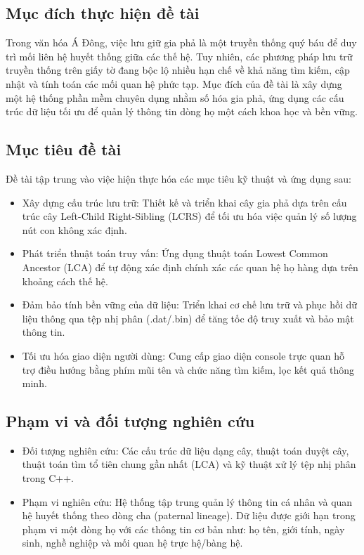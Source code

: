 \subsection{Mục đích thực hiện đề tài}

Trong văn hóa Á Đông, việc lưu giữ gia phả là một truyền thống quý báu để duy trì mối liên hệ huyết thống giữa các thế hệ. Tuy nhiên, các phương pháp lưu trữ truyền thống trên giấy tờ đang bộc lộ nhiều hạn chế về khả năng tìm kiếm, cập nhật và tính toán các mối quan hệ phức tạp. Mục đích của đề tài là xây dựng một hệ thống phần mềm chuyên dụng nhằm số hóa gia phả, ứng dụng các cấu trúc dữ liệu tối ưu để quản lý thông tin dòng họ một cách khoa học và bền vững.

\subsection{Mục tiêu đề tài}
Đề tài tập trung vào việc hiện thực hóa các mục tiêu kỹ thuật và ứng dụng sau:
\begin{itemize}
	\item Xây dựng cấu trúc lưu trữ: Thiết kế và triển khai cây gia phả dựa trên cấu trúc cây Left-Child Right-Sibling (LCRS) để tối ưu hóa việc quản lý số lượng nút con không xác định.
	\item Phát triển thuật toán truy vấn: Ứng dụng thuật toán Lowest Common Ancestor (LCA) để tự động xác định chính xác các quan hệ họ hàng dựa trên khoảng cách thế hệ.
	\item Đảm bảo tính bền vững của dữ liệu: Triển khai cơ chế lưu trữ và phục hồi dữ liệu thông qua tệp nhị phân (.dat/.bin) để tăng tốc độ truy xuất và bảo mật thông tin.
	\item Tối ưu hóa giao diện người dùng: Cung cấp giao diện console trực quan hỗ trợ điều hướng bằng phím mũi tên và chức năng tìm kiếm, lọc kết quả thông minh.
\end{itemize}

\subsection{Phạm vi và đối tượng nghiên cứu}
\begin{itemize}
	\item Đối tượng nghiên cứu: Các cấu trúc dữ liệu dạng cây, thuật toán duyệt cây, thuật toán tìm tổ tiên chung gần nhất (LCA) và kỹ thuật xử lý tệp nhị phân trong C++.
	\item Phạm vi nghiên cứu: Hệ thống tập trung quản lý thông tin cá nhân và quan hệ huyết thống theo dòng cha (paternal lineage). Dữ liệu được giới hạn trong phạm vi một dòng họ với các thông tin cơ bản như: họ tên, giới tính, ngày sinh, nghề nghiệp và mối quan hệ trực hệ/bàng hệ.
\end{itemize}

